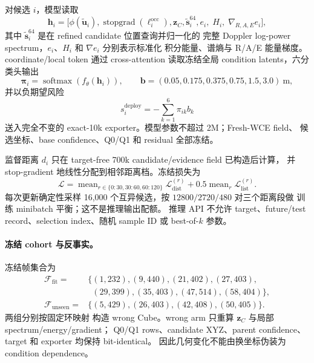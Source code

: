 \documentclass[11pt,a4paper,fontset=none]{ctexart}
\begin{document}
对候选 $i$，模型读取
\begin{equation}
  \mathbf h_i = \bigl[
    \phi(\widetilde{\mathbf u}_i),
    \operatorname{stopgrad}(\ell_i^{\mathrm{occ}}),
    \mathbf z_C,
    \widetilde{\mathbf s}_i^{64},
    e_i,\;H_i,\;\nabla_{R,A,E} e_i
  \bigr],
\end{equation}
其中 $\widetilde{\mathbf s}_i^{64}$ 是在 refined candidate 位置查询并归一化的
完整 Doppler log-power spectrum，$e_i$、$H_i$ 和 $\nabla e_i$ 分别表示标准化
积分能量、谱熵与 R/A/E 能量梯度。coordinate/local token 通过 cross-attention
读取冻结全局 condition latents，六分类头输出
\begin{equation}
  \boldsymbol\pi_i=\operatorname{softmax}(f_\theta(\mathbf h_i)),\qquad
  \mathbf b=(0.05,0.175,0.375,0.75,1.5,3.0)\ \mathrm m,
\end{equation}
并以负期望风险
\begin{equation}
  s_i^{\mathrm{deploy}}=-\sum_{k=1}^{6}\pi_{ik}b_k
\end{equation}
送入完全不变的 exact-10k exporter。模型参数不超过 2M；Fresh-WCE field、
候选坐标、base confidence、Q0/Q1 和 residual 全部冻结。

监督距离 $d_i$ 只在 target-free 700k candidate/evidence field 已构造后计算，
并 stop-gradient 地线性分配到相邻距离档。冻结损失为
\begin{equation}
  \mathcal L = \operatorname{mean}_{r\in\{0\!:\!30,30\!:\!60,60\!:\!120\}}
  \mathcal L_{\mathrm{dist}}^{(r)}
  +0.5\operatorname{mean}_{r}\mathcal L_{\mathrm{list}}^{(r)}.
\end{equation}
每次更新确定性采样 16,000 个互异候选，按 $12800/2720/480$ 对三个距离段做
训练 minibatch 平衡；这不是推理输出配额。
推理 API 不允许 target、future/test record、selection index、随机 sample ID
或 best-of-$k$ 参数。

\paragraph{冻结 cohort 与反事实。}
冻结帧集合为
\begin{align*}
  \mathcal F_{\mathrm{fit}}={}&\{(1,232),(9,440),(21,402),(27,403),\\
  &\phantom{\{}(29,399),(35,403),(47,514),(58,404)\},\\
  \mathcal F_{\mathrm{unseen}}={}&\{(5,429),(26,403),(42,408),(50,405)\}.
\end{align*}
两组分别按固定环映射
构造 wrong Cube。wrong arm 只重算 $\mathbf z_C$ 与局部 spectrum/energy/gradient；
Q0/Q1 rows、candidate XYZ、parent confidence、target 和 exporter 均保持 bit-identical。
因此几何变化不能由换坐标伪装为 condition dependence。
\end{document}
